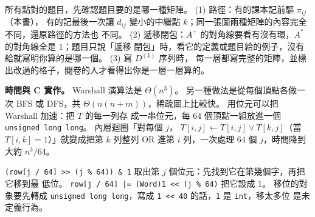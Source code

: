 \begin{examnote}
所有點對的題目，先確認題目要的是哪一種矩陣。 (1) 路徑：有的課本記前驅 $\pi_{ij}$（本書），
有的記最後一次讓 $d_{ij}$ 變小的中繼點 $k$；同一張圖兩種矩陣的內容完全不同，還原路徑的方法也
不同。 (2) 遞移閉包：$A^{+}$ 的對角線要看有沒有環，$A^{*}$ 的對角線全是 $1$；題目只說「遞移
閉包」時，看它的定義或題目給的例子，沒有給就寫明你算的是哪一個。 (3) 寫 $D^{(k)}$ 序列時，
每一層都寫完整的矩陣，並標出改過的格子，閱卷的人才看得出你是一層一層算的。
\end{examnote}

\textbf{時間與 C 實作。} Warshall 演算法是 $\Theta(n^3)$。 另一種做法是從每個頂點各做一次 BFS
或 DFS，共 $\Theta(n(n + m))$，稀疏圖上比較快。 用位元可以把 Warshall 加速：把 $T$ 的每一列存
成一串位元，每 $64$ 個頂點一組放進一個 \texttt{unsigned long long}。 內層迴圈「對每個 $j$，
$T[i, j] \gets T[i, j] \lor T[k, j]$（當 $T[i, k] = 1$）」就變成把第 $k$ 列整列 OR 進第 $i$
列，一次處理 $64$ 個 $j$，時間降到大約 $n^3 / 64$。

\begin{cbookrecap}[第~12~章 12.3、12.6 節，第~13~章 13.2 節]
\texttt{(row[j / 64] >> (j \% 64)) \& 1} 取出第 $j$ 個位元：先找到它在第幾個字，再把它移到最
低位。 \texttt{row[j / 64] |= (Word)1 << (j \% 64)} 把它設成 $1$。 移位的對象要先轉成
\texttt{unsigned long long}，寫成 \texttt{1 << 40} 的話，\texttt{1} 是 \texttt{int}，移太多位
是未定義行為。
\end{cbookrecap}

